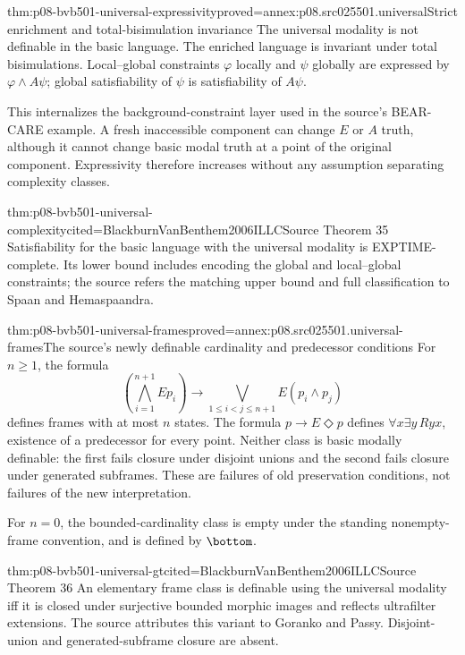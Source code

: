 \begin{hbtheorem}{thm:p08-bvb501-universal-expressivity}{proved=annex:p08.src025501.universal}{Strict enrichment and total-bisimulation invariance}
The universal modality is not definable in the basic language. The
enriched language is invariant under total bisimulations. Local--global
constraints \(\varphi\) locally and \(\psi\) globally are
expressed by \(\varphi\land A\psi\); global satisfiability of
\(\psi\) is satisfiability of \(A\psi\).
\end{hbtheorem}

This internalizes the background-constraint layer used in the source's
BEAR-CARE example. A fresh inaccessible component can change \(E\)
or \(A\) truth, although it cannot change basic modal truth at a
point of the original component. Expressivity therefore increases
without any assumption separating complexity classes.

\begin{hbtheorem}{thm:p08-bvb501-universal-complexity}{cited=BlackburnVanBenthem2006ILLC}{Source Theorem 35}
Satisfiability for the basic language with the universal modality is
EXPTIME-complete. Its lower bound includes encoding the global and
local--global constraints; the source refers the matching upper bound
and full classification to Spaan and Hemaspaandra.
\end{hbtheorem}

\begin{hbtheorem}{thm:p08-bvb501-universal-frames}{proved=annex:p08.src025501.universal-frames}{The source's newly definable cardinality and predecessor conditions}
For \(n\geq1\), the formula
\[
 \left(\bigwedge_{i=1}^{n+1}Ep_i\right)
       \to\bigvee_{1\leq i<j\leq n+1}E(p_i\land p_j)
\]
defines frames with at most \(n\) states. The formula
\(p\to E\Diamond p\) defines
\(\forall x\exists y\,Ryx\), existence of a predecessor
for every point. Neither class is basic modally definable: the first
fails closure under disjoint unions and the second fails closure under
generated subframes. These are failures of old preservation conditions,
not failures of the new interpretation.
\end{hbtheorem}

For \(n=0\), the bounded-cardinality class is empty under the standing
nonempty-frame convention, and is defined by \(\bottom\).

\begin{hbtheorem}{thm:p08-bvb501-universal-gt}{cited=BlackburnVanBenthem2006ILLC}{Source Theorem 36}
An elementary frame class is definable using the universal modality iff
it is closed under surjective bounded morphic images and reflects
ultrafilter extensions. The source attributes this variant to Goranko
and Passy. Disjoint-union and generated-subframe closure are absent.
\end{hbtheorem}

